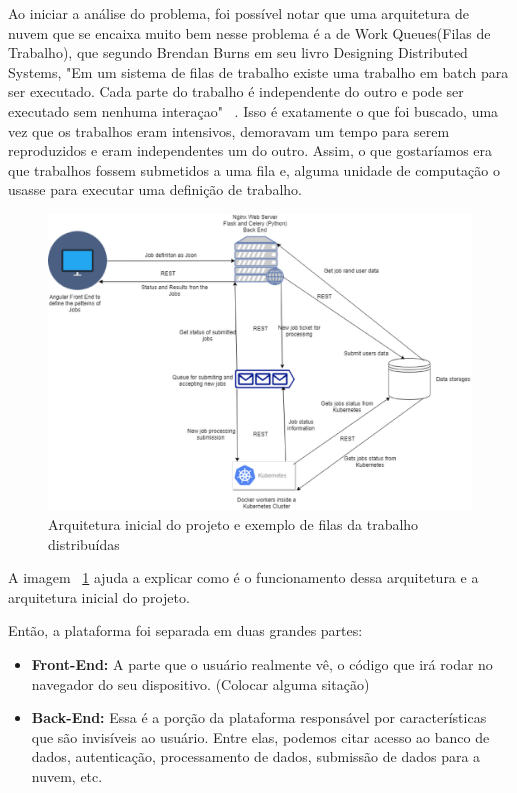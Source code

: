 \documentclass[11pt,twoside]{article}
\begin{document}
Ao iniciar a análise do problema, foi possível notar que uma arquitetura de nuvem que se encaixa muito bem nesse problema é a de Work Queues(Filas de Trabalho), que segundo Brendan Burns em seu livro
Designing Distributed Systems, "Em um sistema de filas de trabalho existe uma trabalho em batch para ser executado. Cada parte do trabalho é independente do outro e pode ser executado sem nenhuma interaçao" 
~\cite{BB}.
Isso é exatamente o que foi buscado, uma vez que os trabalhos eram intensivos, demoravam um tempo para serem reproduzidos e eram independentes um do outro. Assim, o que gostaríamos era que trabalhos fossem submetidos
a uma fila e, alguma unidade de computação o usasse para executar uma definição de trabalho.

\begin{figure}[!h]
  \centering
  \includegraphics[scale=0.4]{arch.eps}
  \caption{Arquitetura inicial do projeto e exemplo de filas da trabalho distribuídas}
  \label{fig:archtec}
\end{figure}

A imagem ~\ref{fig:archtec} ajuda a explicar como é o funcionamento dessa arquitetura e a arquitetura inicial do projeto.

Então, a plataforma foi separada em duas grandes partes:

\begin{itemize}
  \item \textbf{Front-End:} A parte que o usuário realmente vê, o código que irá rodar no navegador do seu dispositivo. (Colocar alguma sitação)
  \item \textbf{Back-End:} Essa é a porção da plataforma responsável por características que são invisíveis ao usuário. Entre elas, podemos citar acesso ao banco de dados, autenticação, processamento de dados,
  submissão de dados para a nuvem, etc.
\end{itemize}
\end{document}
